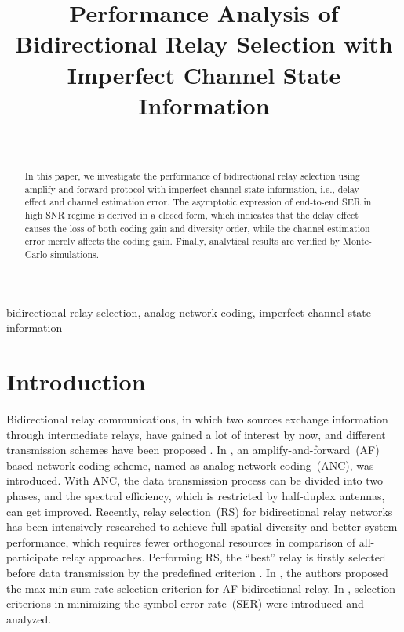 \documentclass[onecolumn,letterpaper,11pt,draftclsnofoot]{IEEEtran}
\begin{document}
\title{Performance Analysis of Bidirectional Relay Selection with Imperfect Channel State Information}

\author{\\
}

\maketitle
\begin{abstract}
In this paper, we investigate the performance of bidirectional relay
selection using amplify-and-forward protocol with imperfect channel state
information, i.e., delay effect and channel estimation error. The
asymptotic expression of end-to-end SER in high SNR regime is
derived in a closed form, which indicates that the delay effect
causes the loss of both coding gain and diversity order, while the
channel estimation error merely affects the coding gain. Finally,
analytical results are verified by Monte-Carlo simulations.
\end{abstract}
\begin{keywords}
bidirectional relay selection, analog network coding, imperfect
channel state information
\end{keywords}

\section{Introduction}

Bidirectional relay communications, in which two sources exchange
information through intermediate relays, have gained a lot of
interest by now, and different transmission schemes have been
proposed \cite{Katti2008}. In \cite{Popovski2007,Louie2010}, an
amplify-and-forward~(AF) based network coding scheme, named as
analog network coding~(ANC), was introduced. With ANC, the data
transmission process can be divided into two phases, and the
spectral efficiency, which is restricted by half-duplex antennas,
can get improved. Recently, relay selection~(RS) for bidirectional
relay networks has been intensively researched to achieve full
spatial diversity and better system performance, which requires
fewer orthogonal resources in comparison of all-participate relay
approaches\cite{Bletsas2006,Ibrahim2008}. Performing RS, the
``best'' relay is firstly selected before data transmission by the
predefined criterion
\cite{Zhang2009,Kyu2009,Song2010,Song2011,Jing2009,Nguyen2010}. In
\cite{Zhang2009,Kyu2009}, the authors proposed the max-min sum rate
selection criterion for AF bidirectional relay. In
\cite{Song2010,Song2011,Jing2009,Nguyen2010}, selection criterions
in minimizing the symbol error rate~(SER) were introduced and
analyzed.
\end{document}
